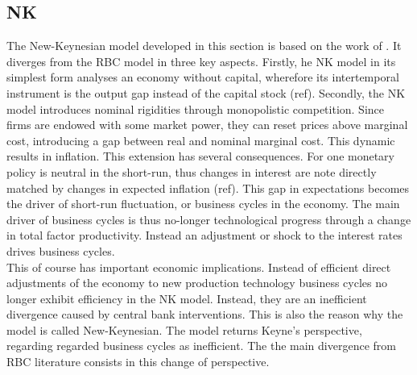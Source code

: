 \documentclass[12pt,a4paper,english]{article} %
\begin{document}
	\subsection{NK}
	The New-Keynesian model developed in this section is based on the work of \cite{gali_monetary_2008}. It diverges from the RBC model in three key aspects. Firstly, he NK model in its simplest form analyses an economy without capital, wherefore its intertemporal  instrument is the output gap instead of the capital stock (ref). Secondly, the NK model introduces nominal rigidities through monopolistic competition. Since firms are endowed with some market power, they can reset prices above marginal cost, introducing a gap between real and nominal marginal cost. This dynamic results in inflation. This extension has several consequences. For one monetary policy is neutral in the short-run, thus changes in interest are note directly matched by changes in expected inflation (ref). This gap in expectations becomes the driver of short-run fluctuation, or business cycles in the economy. The main driver of business cycles is thus no-longer technological progress through a change in total factor productivity. Instead an adjustment or shock to the interest rates drives business cycles. \\
	This of course has important economic implications. Instead of efficient direct adjustments of the economy to new production technology business cycles no longer exhibit efficiency in the NK model. Instead, they are an inefficient divergence caused by central bank interventions. This is also the reason why the model is called New-Keynesian. The model returns Keyne's perspective, regarding regarded business cycles as inefficient. The the main divergence from RBC literature consists in this change of perspective.
		
\end{document}
